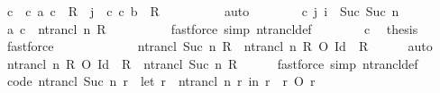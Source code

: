 \begin{isabellebody}
\ c\ \ c{}{\isacharcolon}{\kern0pt}\ {\isachardoublequoteopen}{\isacharparenleft}{\kern0pt}a{\isacharcomma}{\kern0pt}\ c{\isacharparenright}{\kern0pt}\ {\isasymin}\ R\ {\isacharcircum}{\kern0pt}{\isacharcircum}{\kern0pt}\ j{\isachardoublequoteclose}\ \ c{}{\isacharcolon}{\kern0pt}\ {\isachardoublequoteopen}{\isacharparenleft}{\kern0pt}c{\isacharcomma}{\kern0pt}\ b{\isacharparenright}{\kern0pt}\ {\isasymin}\ R{\isachardoublequoteclose}\isanewline
\ \ \ \ \ \ \ \ \isamarkupfalse%
\ auto\isanewline
\ \ \ \ \ \ \isamarkupfalse%
\ c{}\ j\ {\isacartoucheopen}i\ {\isasymle}\ Suc\ {\isacharparenleft}{\kern0pt}Suc\ n{\isacharparenright}{\kern0pt}{\isacartoucheclose}\ \isamarkupfalse%
\ {\isachardoublequoteopen}{\isacharparenleft}{\kern0pt}a{\isacharcomma}{\kern0pt}\ c{\isacharparenright}{\kern0pt}\ {\isasymin}\ ntrancl\ n\ R{\isachardoublequoteclose}\isanewline
\ \ \ \ \ \ \ \ \isamarkupfalse%
\ {\isacharparenleft}{\kern0pt}fastforce\ simp{\isacharcolon}{\kern0pt}\ ntrancl{\isacharunderscore}{\kern0pt}def{\isacharparenright}{\kern0pt}\isanewline
\ \ \ \ \ \ \isamarkupfalse%
\ c{}\ \isamarkupfalse%
\ {\isacharquery}{\kern0pt}thesis\ \isamarkupfalse%
\ fastforce\isanewline
\ \ \ \ \isamarkupfalse%
\isanewline
\ \ \isamarkupfalse%
\isanewline
\ \ \isamarkupfalse%
\ \isamarkupfalse%
\ {\isachardoublequoteopen}ntrancl\ {\isacharparenleft}{\kern0pt}Suc\ n{\isacharparenright}{\kern0pt}\ R\ {\isasymsubseteq}\ ntrancl\ n\ R\ O\ {\isacharparenleft}{\kern0pt}Id\ {\isasymunion}\ R{\isacharparenright}{\kern0pt}{\isachardoublequoteclose}\isanewline
\ \ \ \ \isamarkupfalse%
\ auto\isanewline
\ \ \isamarkupfalse%
\ {\isachardoublequoteopen}ntrancl\ n\ R\ O\ {\isacharparenleft}{\kern0pt}Id\ {\isasymunion}\ R{\isacharparenright}{\kern0pt}\ {\isasymsubseteq}\ ntrancl\ {\isacharparenleft}{\kern0pt}Suc\ n{\isacharparenright}{\kern0pt}\ R{\isachardoublequoteclose}\isanewline
\ \ \ \ \isamarkupfalse%
\ {\isacharparenleft}{\kern0pt}fastforce\ simp{\isacharcolon}{\kern0pt}\ ntrancl{\isacharunderscore}{\kern0pt}def{\isacharparenright}{\kern0pt}\isanewline
{}\isamarkupfalse%
%
\endisatagproof
{\isafoldproof}%
%
\isadelimproof
\isanewline
%
\endisadelimproof
\isanewline
{}\isamarkupfalse%
\ {\isacharbrackleft}{\kern0pt}code{\isacharbrackright}{\kern0pt}{\isacharcolon}{\kern0pt}\ {\isachardoublequoteopen}ntrancl\ {\isacharparenleft}{\kern0pt}Suc\ n{\isacharparenright}{\kern0pt}\ r\ {\isacharequal}{\kern0pt}\ {\isacharparenleft}{\kern0pt}let\ r{\isacharprime}{\kern0pt}\ {\isacharequal}{\kern0pt}\ ntrancl\ n\ r\ in\ r{\isacharprime}{\kern0pt}\ {\isasymunion}\ r{\isacharprime}{\kern0pt}\ O\ r{\isacharparenright}{\kern0pt}{\isachardoublequoteclose}\isanewline

\end{isabellebody}
